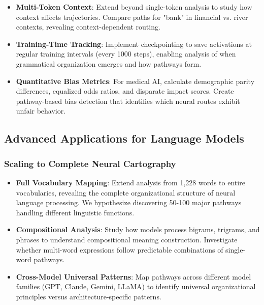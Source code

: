 \begin{itemize}
    \item \textbf{Multi-Token Context}: Extend beyond single-token analysis to study how context affects trajectories. Compare paths for "bank" in financial vs. river contexts, revealing context-dependent routing.
    
    \item \textbf{Training-Time Tracking}: Implement checkpointing to save activations at regular training intervals (every 1000 steps), enabling analysis of when grammatical organization emerges and how pathways form.
    
    \item \textbf{Quantitative Bias Metrics}: For medical AI, calculate demographic parity differences, equalized odds ratios, and disparate impact scores. Create pathway-based bias detection that identifies which neural routes exhibit unfair behavior.
\end{itemize}

\subsection{Advanced Applications for Language Models}

\subsubsection{Scaling to Complete Neural Cartography}

\begin{itemize}
    \item \textbf{Full Vocabulary Mapping}: Extend analysis from 1,228 words to entire vocabularies, revealing the complete organizational structure of neural language processing. We hypothesize discovering 50-100 major pathways handling different linguistic functions.
    
    \item \textbf{Compositional Analysis}: Study how models process bigrams, trigrams, and phrases to understand compositional meaning construction. Investigate whether multi-word expressions follow predictable combinations of single-word pathways.
    
    \item \textbf{Cross-Model Universal Patterns}: Map pathways across different model families (GPT, Claude, Gemini, LLaMA) to identify universal organizational principles versus architecture-specific patterns.
\end{itemize}

